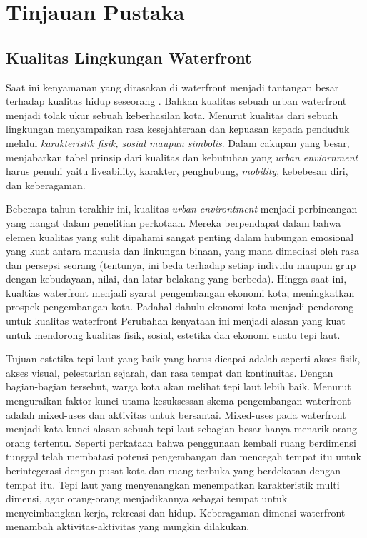 \documentclass[../thesis.tex]{subfiles}
\begin{document}
\chapter{Tinjauan Pustaka}\label{chap:pstk}
\section{Kualitas Lingkungan Waterfront}
Saat ini kenyamanan yang dirasakan di waterfront menjadi tantangan besar terhadap kualitas hidup seseorang \citep{li2020}. Bahkan kualitas sebuah urban waterfront menjadi tolak ukur sebuah keberhasilan kota. Menurut \cite{lansing1969evaluation} kualitas dari sebuah lingkungan menyampaikan rasa kesejahteraan dan kepuasan kepada penduduk melalui \textit{karakteristik fisik, sosial maupun simbolis}. Dalam cakupan yang besar, \cite{smith1997quality} menjabarkan tabel prinsip dari kualitas dan kebutuhan yang \textit{urban enviornment } harus penuhi yaitu \textit{}liveability, karakter, penghubung, \textit{mobility}, kebebesan diri, dan keberagaman.

Beberapa tahun terakhir ini, kualitas \textit{urban environtment} menjadi perbincangan yang hangat dalam penelitian perkotaan. Mereka berpendapat dalam \cite{hubbard1996design} bahwa elemen kualitas yang sulit dipahami sangat penting dalam hubungan emosional yang kuat antara manusia dan linkungan binaan, yang mana dimediasi oleh rasa dan persepsi seorang (tentunya, ini beda terhadap setiap individu maupun grup dengan kebudayaan, nilai, dan latar belakang yang berbeda). Hingga saat ini, kualtias waterfront menjadi syarat pengembangan ekonomi kota; meningkatkan prospek pengembangan kota. Padahal dahulu ekonomi kota menjadi pendorong untuk kualitas waterfront
Perubahan kenyataan ini menjadi alasan yang kuat untuk mendorong kualitas fisik, sosial, estetika dan ekonomi suatu tepi laut.

Tujuan estetika tepi laut yang baik yang harus dicapai adalah seperti akses fisik, akses visual, pelestarian sejarah, dan rasa tempat dan kontinuitas\citep{richarda.lehmann1966}. Dengan bagian-bagian tersebut, warga kota akan melihat tepi laut lebih baik.
Menurut \cite{tunbridge1992} menguraikan faktor kunci utama kesuksessan skema pengembangan waterfront adalah mixed-uses dan aktivitas untuk bersantai. Mixed-uses pada waterfront menjadi kata kunci alasan sebuah tepi laut sebagian besar hanya menarik orang-orang tertentu. Seperti perkataan \cite{gospodini2001} bahwa penggunaan kembali ruang berdimensi tunggal telah membatasi potensi pengembangan dan mencegah tempat itu untuk berintegerasi dengan pusat kota dan ruang terbuka yang berdekatan dengan tempat itu. Tepi laut yang menyenangkan menempatkan karakteristik multi dimensi, agar orang-orang menjadikannya sebagai tempat untuk menyeimbangkan kerja, rekreasi dan hidup. Keberagaman dimensi waterfront menambah aktivitas-aktivitas yang mungkin dilakukan.
\end{document}
